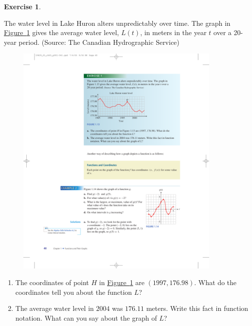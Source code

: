 \documentclass[10pt,]{book}
\theoremstyle{plain}
\theoremstyle{definition}
\theoremstyle{definition}
\theoremstyle{definition}
\theoremstyle{definition}
\newtheorem{exercise}[theorem]{Exercise}
\numberwithin{equation}{section}
\begin{document}
\begin{exercise}\label{exercise-18}

       The water level in Lake Huron alters unpredictably over time. The graph in \hyperref[fig-Lake-Huron]{Figure~\ref{fig-Lake-Huron}} gives the average water level, \(L(t)\), in meters in the year \(t\) over a 20-year period. (Source: The Canadian Hydrographic Service) 
       \leavevmode%
\begin{figure}
\centering
\includegraphics[width=0.90\textwidth,]{images/fig-Lake-Huron.pdf}\caption{\label{fig-Lake-Huron}}
\end{figure}

       \leavevmode%
\begin{enumerate}[label=*\alph**]
\item\hypertarget{li-121}{}The coordinates of point \(H\) in \hyperref[fig-Lake-Huron]{Figure~\ref{fig-Lake-Huron}} are \((1997, 176.98)\). What do the coordinates tell you about the function \(L\)?%
\item\hypertarget{li-122}{}The average water level in \(2004\) was \(176.11\) meters. Write this fact in function notation. What can you say about the graph of \(L\)?%
\end{enumerate}

\end{exercise}
\par
\end{document}
